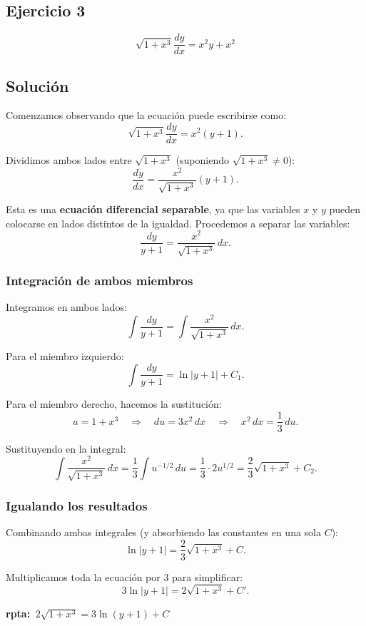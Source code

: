 \documentclass[12pt,a4paper]{article}
\begin{document}
\begin{multicols}{2}
\section*{Ejercicio 3}
\[\sqrt{1+x^3}\frac{dy}{dx}=x^2y+x^2 \]

\subsection*{Solución}


Comenzamos observando que la ecuación puede escribirse como:
\[
\sqrt{1+x^{3}}\frac{dy}{dx} = x^{2}(y+1).
\]

Dividimos ambos lados entre $\sqrt{1+x^{3}}$ (suponiendo $\sqrt{1+x^{3}} \neq 0$):
\[
\frac{dy}{dx} = \frac{x^{2}}{\sqrt{1+x^{3}}}(y+1).
\]

\noindent
Esta es una \textbf{ecuación diferencial separable}, ya que las variables $x$ y $y$ pueden colocarse en lados distintos de la igualdad.  
Procedemos a separar las variables:
\[
\frac{dy}{y+1} = \frac{x^{2}}{\sqrt{1+x^{3}}}\,dx.
\]

\subsubsection*{Integración de ambos miembros}

Integramos en ambos lados:
\[
\int \frac{dy}{y+1} = \int \frac{x^{2}}{\sqrt{1+x^{3}}}\,dx.
\]

\noindent
Para el miembro izquierdo:
\[
\int \frac{dy}{y+1} = \ln|y+1| + C_{1}.
\]

\noindent
Para el miembro derecho, hacemos la sustitución:
\[
u = 1 + x^{3} \quad \Rightarrow \quad du = 3x^{2}\,dx \quad \Rightarrow \quad x^{2}\,dx = \frac{1}{3}\,du.
\]

Sustituyendo en la integral:
\[
\int \frac{x^{2}}{\sqrt{1+x^{3}}}\,dx 
= \frac{1}{3} \int u^{-1/2}\,du 
= \frac{1}{3} \cdot 2u^{1/2}
= \frac{2}{3}\sqrt{1+x^{3}} + C_{2}.
\]

\subsubsection*{Igualando los resultados}
Combinando ambas integrales (y absorbiendo las constantes en una sola $C$):
\[
\ln|y+1| = \frac{2}{3}\sqrt{1+x^{3}} + C.
\]

Multiplicamos toda la ecuación por $3$ para simplificar:
\[
3\ln|y+1| = 2\sqrt{1+x^{3}} + C'.
\]

\textbf{rpta: $\,2\sqrt{1+x^{3}} = 3\ln(y+1) + C\,$}


\end{multicols}
\end{document}
